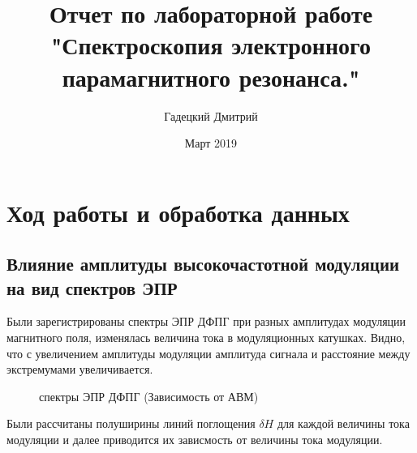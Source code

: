 \documentclass[a4paper,12pt]{article}
\title{Отчет по лабораторной работе "Спектроскопия электронного парамагнитного резонанса."}
\author{Гадецкий Дмитрий}
\date{Март 2019}
\theoremstyle{plain} %
\theoremstyle{definition} %
\theoremstyle{remark} %
\begin{document}
\maketitle
\thispagestyle{empty}
\newpage	 

\section{Ход работы и обработка данных}
\subsection{Влияние амплитуды высокочастотной модуляции на вид спектров ЭПР}

Были зарегистрированы спектры ЭПР ДФПГ при разных амплитудах
модуляции магнитного поля, изменялась величина тока в модуляционных
катушках.
Видно, что с увеличением амплитуды модуляции
амплитуда сигнала и расстояние между экстремумами увеличивается.

\begin{figure}[h!]
	\caption{спектры ЭПР ДФПГ (Зависимость от АВМ)}
	\label{fig:image}
\end{figure}

Были рассчитаны полуширины линий поглощения $\delta H$ для каждой величины
тока модуляции и далее приводится их зависмость от величины тока модуляции.
\end{document}
